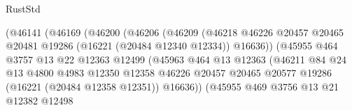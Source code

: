 \begin{lexlean}{RustStd}
\begin{coremodule}
                                      (@46141
                                        (@46169
                                          (@46200
                                            (@46206
                                              (@46209
                                                (@46218
                                                  @46226
                                                  @20457
                                                  @20465
                                                  @20481
                                                  @19286
                                                  (@16221 (@20484 @12340 @12334))
                                                  @16636))
                                              (@45955
                                                @464
                                                @3757
                                                @13
                                                @22
                                                @12363
                                                @12499
                                                (@45963
                                                  @464
                                                  @13
                                                  @12363
                                                  (@46211
                                                    @84
                                                    @24
                                                    @13
                                                    @4800
                                                    @4983
                                                    @12350
                                                    @12358
                                                    @46226
                                                    @20457
                                                    @20465
                                                    @20577
                                                    @19286
                                                    (@16221 (@20484 @12358 @12351))
                                                    @16636))
                                                (@45955
                                                  @469
                                                  @3756
                                                  @13
                                                  @21
                                                  @12382
                                                  @12498

\end{coremodule}
\end{lexlean}
